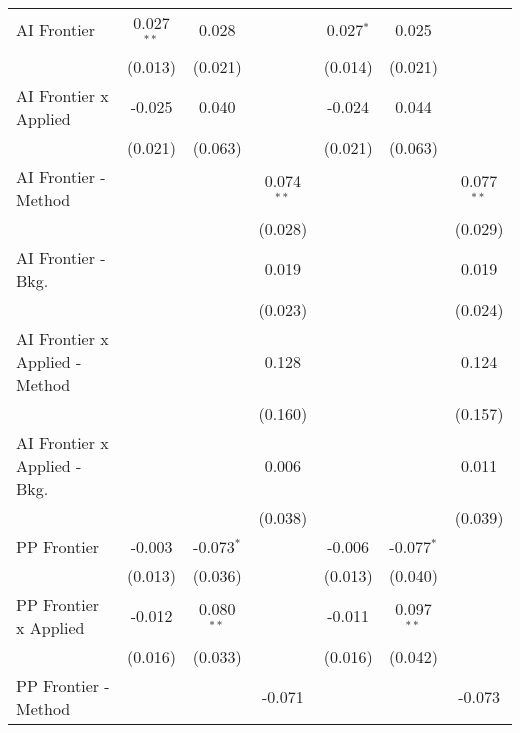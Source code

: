 \begin{tabular}{lcccccc}
   AI Frontier                    & 0.027$^{**}$ & 0.028        &               & 0.027$^{*}$ & 0.025        &   \\   
                                  & (0.013)      & (0.021)      &               & (0.014)     & (0.021)      &   \\   
   AI Frontier x Applied          & -0.025       & 0.040        &               & -0.024      & 0.044        &   \\   
                                  & (0.021)      & (0.063)      &               & (0.021)     & (0.063)      &   \\   
   AI Frontier - Method           &              &              & 0.074$^{**}$  &             &              & 0.077$^{**}$\\   
                                  &              &              & (0.028)       &             &              & (0.029)\\   
   AI Frontier - Bkg.             &              &              & 0.019         &             &              & 0.019\\   
                                  &              &              & (0.023)       &             &              & (0.024)\\   
   AI Frontier x Applied - Method &              &              & 0.128         &             &              & 0.124\\   
                                  &              &              & (0.160)       &             &              & (0.157)\\   
   AI Frontier x Applied - Bkg.   &              &              & 0.006         &             &              & 0.011\\   
                                  &              &              & (0.038)       &             &              & (0.039)\\   
   PP Frontier                    & -0.003       & -0.073$^{*}$ &               & -0.006      & -0.077$^{*}$ &   \\   
                                  & (0.013)      & (0.036)      &               & (0.013)     & (0.040)      &   \\   
   PP Frontier x Applied          & -0.012       & 0.080$^{**}$ &               & -0.011      & 0.097$^{**}$ &   \\   
                                  & (0.016)      & (0.033)      &               & (0.016)     & (0.042)      &   \\   
   PP Frontier - Method           &              &              & -0.071        &             &              & -0.073\\   

\end{tabular}
